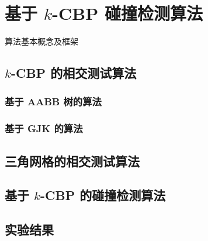 

\chapter{基于 $k$-CBP 碰撞检测算法}
\label{cha:kcbp-collision-detection}
算法基本概念及框架

\section{$k$-CBP 的相交测试算法}
\label{sec:gen-normals}

\subsection{基于 AABB 树的算法}
\label{sec:gen-normals}
\subsection{基于 GJK 的算法}
\label{sec:gen-normals}

\section{三角网格的相交测试算法}
\label{sec:gen-normals}

\section{基于 $k$-CBP 的碰撞检测算法}
\label{sec:search-planes}

\section{实验结果}
\label{sec:exper-cd}
